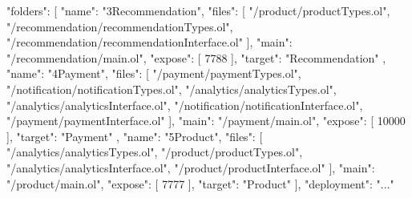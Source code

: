 \begin{jsonlisting}[][caption={Build folders representation in JSON used for prototyping}, label={appen_buildjson}]
{
  "folders": [
    {
      "name": "3Recommendation",
      "files": [
        "/product/productTypes.ol",
        "/recommendation/recommendationTypes.ol",
        "/recommendation/recommendationInterface.ol"
      ],
      "main": "/recommendation/main.ol",
      "expose": [
        7788
      ],
      "target": "Recommendation"
    },
    {
      "name": "4Payment",
      "files": [
        "/payment/paymentTypes.ol",
        "/notification/notificationTypes.ol",
        "/analytics/analyticsTypes.ol",
        "/analytics/analyticsInterface.ol",
        "/notification/notificationInterface.ol",
        "/payment/paymentInterface.ol"
      ],
      "main": "/payment/main.ol",
      "expose": [
        10000
      ],
      "target": "Payment"
    },
    {
      "name": "5Product",
      "files": [
        "/analytics/analyticsTypes.ol",
        "/product/productTypes.ol",
        "/analytics/analyticsInterface.ol",
        "/product/productInterface.ol"
      ],
      "main": "/product/main.ol",
      "expose": [
        7777
      ],
      "target": "Product"
    }
  ],
  "deployment": "..."
}
\end{jsonlisting}